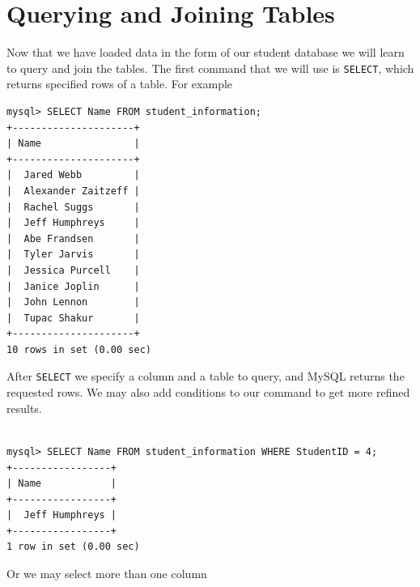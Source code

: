 \section{Querying and Joining Tables}

Now that we have loaded data in the form of our student database we will learn to query and join the tables.  The first command that we will use is {\tt SELECT}, which returns specified rows of a table.  For example

\begin{lstlisting}
mysql> SELECT Name FROM student_information;
+---------------------+
| Name                |
+---------------------+
|  Jared Webb         |
|  Alexander Zaitzeff |
|  Rachel Suggs       |
|  Jeff Humphreys     |
|  Abe Frandsen       |
|  Tyler Jarvis       |
|  Jessica Purcell    |
|  Janice Joplin      |
|  John Lennon        |
|  Tupac Shakur       |
+---------------------+
10 rows in set (0.00 sec)
\end{lstlisting}

After {\tt SELECT} we specify a column and a table to query, and MySQL returns the requested rows.  We may also add conditions to our command to get more refined results.

\begin{lstlisting}

mysql> SELECT Name FROM student_information WHERE StudentID = 4;
+-----------------+
| Name            |
+-----------------+
|  Jeff Humphreys |
+-----------------+
1 row in set (0.00 sec)

\end{lstlisting}

Or we may select more than one column

